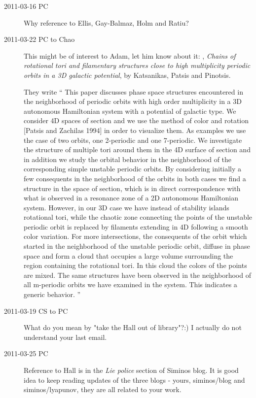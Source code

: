 \begin{description}
\item[2011-03-16 PC] Why reference to Ellis, Gay-Balmaz, Holm
                  and Ratiu?

\item[2011-03-22 PC to Chao]
This might be of interest to Adam, let him know about it:
,
\emph{Chains of rotational tori and filamentary structures close to high
 multiplicity periodic orbits in a 3D galactic potential},
 by Katsanikas, Patsis and Pinotsis.

They write
``
This paper discusses phase space structures encountered in the
neighborhood of periodic orbits with high order multiplicity in a 3D
autonomous Hamiltonian system with a potential of galactic type. We
consider 4D spaces of section and we use the method of color and rotation
[Patsis and Zachilas 1994] in order to visualize them. As examples we use
the case of two orbits, one 2-periodic and one 7-periodic. We investigate
the structure of multiple tori around them in the 4D surface of section
and in addition we study the orbital behavior in the neighborhood of the
corresponding simple unstable periodic orbits. By considering initially a
few consequents in the neighborhood of the orbits in both cases we find a
structure in the space of section, which is in direct correspondence with
what is observed in a resonance zone of a 2D autonomous Hamiltonian
system. However, in our 3D case we have instead of stability islands
rotational tori, while the chaotic zone connecting the points of the
unstable periodic orbit is replaced by filaments extending in 4D
following a smooth color variation. For more intersections, the
consequents of the orbit which started in the neighborhood of the
unstable periodic orbit, diffuse in phase space and form a cloud that
occupies a large volume surrounding the region containing the rotational
tori. In this cloud the colors of the points are mixed. The same
structures have been observed in the neighborhood of all m-periodic
orbits we have examined in the system. This indicates a generic behavior.
''

\item[2011-03-19 CS to PC]
What do you mean by "take the Hall out of library"?:) I actually do not
understand your last email.

\item[2011-03-25 PC]
Reference to Hall is in the {\em Lie police} section of Siminos
blog. It is good idea to keep reading updates of the three blogs - yours,
siminos/blog and siminos/lyapunov, they are all related to your work.


\end{description}
